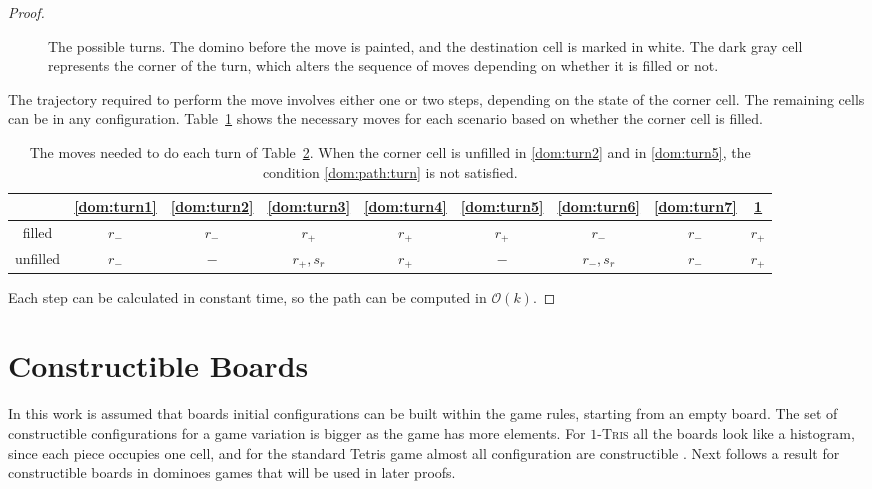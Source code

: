 \begin{proof}
\begin{figure}[h]
\begin{subfigure}[b]{0.1\textwidth}
    \caption{\label{dom:turn8}}
  \end{subfigure}
    \caption{The possible turns. The domino before the move is painted, and the destination cell is marked in white. The dark gray cell represents the corner of the turn, which alters the sequence of moves depending on whether it is filled or not.} 
    \label{dom:turns} 
\end{figure}
The trajectory required to perform the move involves either one or two steps, depending on the state of the corner cell. The remaining cells can be in any configuration. Table~\ref{dom:turns-table} shows the necessary moves for each scenario based on whether the corner cell is filled.

\begin{table}[ht]
\centering
\begin{tabular}{|c || c | c | c | c | c | c | c | c |} 
 \hline
  & \ref{dom:turn1} & \ref{dom:turn2} & \ref{dom:turn3} & \ref{dom:turn4} & \ref{dom:turn5} & \ref{dom:turn6} & \ref{dom:turn7} & \ref{dom:turn8} \\
 \hline               
  filled & $ r_-  $ & $      r_-    $ & $   r_+       $ & $   r_+       $ & $   r_+       $ & $     r_-     $ & $   r_-       $ & $   r_+      $  \\
 \hline               
unfilled & $ r_-  $ & $     -       $ & $   r_+, s_r  $ & $   r_+       $ & $    -        $ & $  r_-, s_r   $ & $   r_-       $ & $   r_+      $  \\
 \hline               

\end{tabular}
\caption{The moves needed to do each turn of Table~\ref{dom:turns}. When the corner cell is unfilled in \ref{dom:turn2} and in \ref{dom:turn5}, the condition \ref{dom:path:turn} is not satisfied. }
\label{dom:turns-table}
\end{table}

Each step can be calculated in constant time, so the path can be computed in $\mathcal{O}(k)$.

\end{proof}


\section{Constructible Boards}

In this work is assumed that boards initial configurations can be built within the game rules, starting from an empty board. The set of constructible configurations for a game variation is bigger as the game has more elements. For $1$\textsc{-Tris} all the boards look like a histogram, since each piece occupies one cell, and for the standard Tetris game almost all configuration are constructible \cite{HCTC}. Next follows a result for constructible boards in dominoes games that will be used in later proofs.

